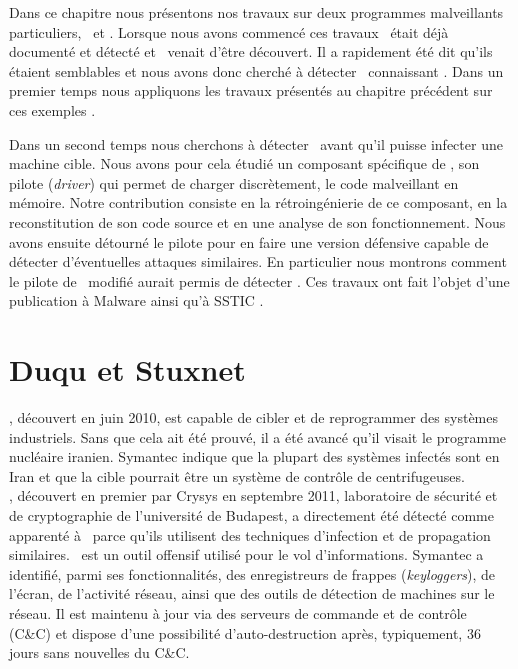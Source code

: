 Dans ce chapitre nous présentons nos travaux sur deux programmes malveillants particuliers, \duqu\ et \stux.
Lorsque nous avons commencé ces travaux \stux\ était déjà documenté et détecté et \duqu\ venait d'être découvert.
Il a rapidement été dit qu'ils étaient semblables et nous avons donc cherché à détecter \duqu\ connaissant \stux.
Dans un premier temps nous appliquons les travaux présentés au chapitre précédent sur ces exemples \cite{REAT12,mal12}.

Dans un second temps nous cherchons à détecter \duqu\ avant qu'il puisse infecter une machine cible.
Nous avons pour cela étudié un composant spécifique de \duqu, son pilote (\emph{driver}) qui permet de charger discrètement, le code malveillant en mémoire.
Notre contribution consiste en la rétroingénierie de ce composant, en la reconstitution de son code source et en une analyse de son fonctionnement.
Nous avons ensuite détourné le pilote pour en faire une version défensive capable de détecter d'éventuelles attaques similaires.
En particulier nous montrons comment le pilote de \duqu\ modifié aurait permis de détecter \duqu.
Ces travaux ont fait l'objet d'une publication à Malware \cite{mal13} ainsi qu'à SSTIC \cite{sstic13}.


\section{Duqu et Stuxnet}
\stux, découvert en juin 2010, est capable de cibler et de reprogrammer des systèmes industriels.
Sans que cela ait été prouvé, il a été avancé qu'il visait le programme nucléaire iranien. 
Symantec \cite{SymantecStux2011} indique que la plupart des systèmes infectés sont en Iran et que la cible pourrait être un système de contrôle de centrifugeuses.
\\

\duqu, découvert en premier par Crysys \cite{CrysysDuquStuxnet} en septembre 2011, laboratoire de sécurité et de cryptographie de l'université de Budapest, a directement été détecté comme apparenté à \stux\ parce qu'ils utilisent des techniques d'infection et de propagation similaires.
\duqu\ est un outil offensif utilisé pour le vol d'informations. Symantec \cite{SymantecDuqu2011} a identifié, parmi ses fonctionnalités, des enregistreurs de frappes (\emph{keyloggers}), de l'écran, de l'activité réseau, ainsi que des outils de détection de machines sur le réseau.
Il est maintenu à jour via des serveurs de commande et de contrôle (C\&C) et dispose d'une possibilité d'auto-destruction après, typiquement, 36 jours sans nouvelles du C\&C.

